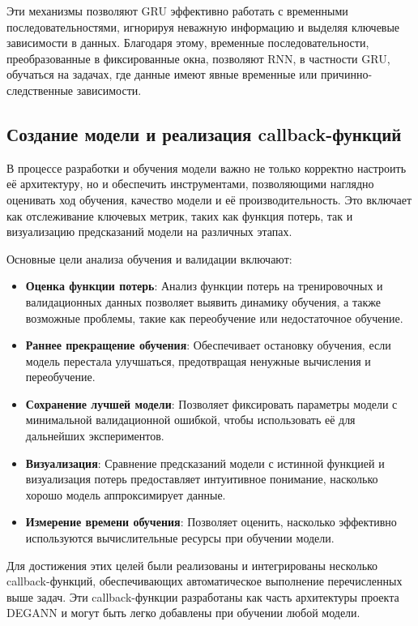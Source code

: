 Эти механизмы позволяют GRU эффективно работать с временными последовательностями, игнорируя неважную информацию и выделяя ключевые зависимости в данных. Благодаря этому, временные последовательности, преобразованные в фиксированные окна, позволяют RNN, в частности GRU, обучаться на задачах, где данные имеют явные временные или причинно-следственные зависимости.


\subsection{Создание модели и реализация callback-функций}
\label{subsec:task3}

В процессе разработки и обучения модели важно не только корректно настроить её архитектуру, но и обеспечить инструментами, позволяющими наглядно оценивать ход обучения, качество модели и её производительность. Это включает как отслеживание ключевых метрик, таких как функция потерь, так и визуализацию предсказаний модели на различных этапах.

Основные цели анализа обучения и валидации включают:
\begin{itemize}
    \item \textbf{Оценка функции потерь}: Анализ функции потерь на тренировочных и валидационных данных позволяет выявить динамику обучения, а также возможные проблемы, такие как переобучение или недостаточное обучение.
    \item \textbf{Раннее прекращение обучения}: Обеспечивает остановку обучения, если модель перестала улучшаться, предотвращая ненужные вычисления и переобучение.
    \item \textbf{Сохранение лучшей модели}: Позволяет фиксировать параметры модели с минимальной валидационной ошибкой, чтобы использовать её для дальнейших экспериментов.
    \item \textbf{Визуализация}: Сравнение предсказаний модели с истинной функцией и визуализация потерь предоставляет интуитивное понимание, насколько хорошо модель аппроксимирует данные.
    \item \textbf{Измерение времени обучения}: Позволяет оценить, насколько эффективно используются вычислительные ресурсы при обучении модели.
\end{itemize}

Для достижения этих целей были реализованы и интегрированы несколько callback-функций, обеспечивающих автоматическое выполнение перечисленных выше задач. Эти callback-функции разработаны как часть архитектуры проекта DEGANN и могут быть легко добавлены при обучении любой модели.

